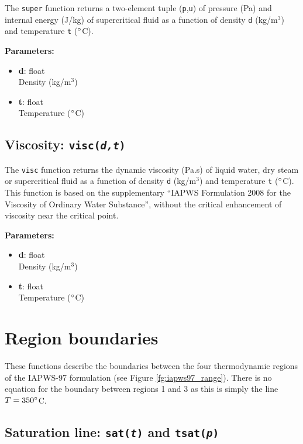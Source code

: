 The \texttt{super} function returns a two-element tuple (\texttt{p},\texttt{u}) of pressure (Pa) and internal energy (J/kg) of supercritical fluid as a function of density \texttt{d} (kg/m$^3$) and temperature \texttt{t} ($\degree$C).

\textbf{Parameters:}
\begin{itemize}
\item \textbf{d}: float\\
  Density (kg/m$^3$)
\item \textbf{t}: float\\
  Temperature ($\degree$C)
\end{itemize}

\begin{snugshade}
\section{Viscosity: \texttt{visc(\emph{d,t})}}
\end{snugshade}
\label{sec:iapws97:visc}

The \texttt{visc} function returns the dynamic viscosity (Pa.s) of liquid water, dry steam or supercritical fluid as a function of density \texttt{d} (kg/m$^3$) and temperature \texttt{t} ($\degree$C).  This function is based on the supplementary ``IAPWS Formulation 2008 for the Viscosity of Ordinary Water Substance'', without the critical enhancement of viscosity near the critical point.

\textbf{Parameters:}
\begin{itemize}
\item \textbf{d}: float\\
  Density (kg/m$^3$)
\item \textbf{t}: float\\
  Temperature ($\degree$C)
\end{itemize}

\section{Region boundaries}

These functions describe the boundaries between the four thermodynamic regions of the IAPWS-97 formulation (see Figure \ref{fg:iapws97_range}).  There is no equation for the boundary between regions 1 and 3 as this is simply the line $T = 350 \degree$C.

\subsection{Saturation line: \texttt{sat(\emph{t})} and \texttt{tsat(\emph{p})}}

